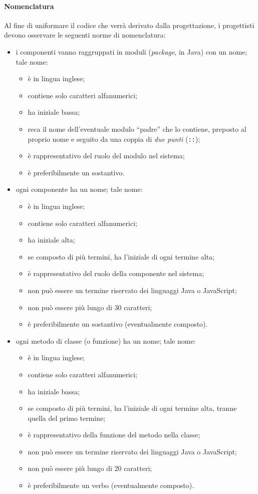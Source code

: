 	\paragraph{Nomenclatura} Al fine di uniformare il codice che verrà derivato dalla progettazione, i progettisti devono osservare le seguenti norme di nomenclatura:
	\begin{itemize}
		\item i componenti vanno raggruppati in moduli (\emph{package}, in Java) con un nome; tale nome:
		\begin{itemize}
			\item è in lingua inglese;
			\item contiene solo caratteri alfanumerici;
			\item ha iniziale bassa;
			\item reca il nome dell'eventuale modulo “padre” che lo contiene, preposto al proprio nome e seguito da una coppia di \emph{due punti} (\texttt{::});
			\item è rappresentativo del ruolo del modulo nel sistema;
			\item è preferibilmente un sostantivo.
		\end{itemize}
		\item ogni componente ha un nome; tale nome:
		\begin{itemize}
			\item è in lingua inglese;
			\item contiene solo caratteri alfanumerici;
			\item ha iniziale alta;
			\item se composto di più termini, ha l'iniziale di ogni termine alta;
			\item è rappresentativo del ruolo della componente nel sistema;
			\item non può essere un termine riservato dei linguaggi Java o JavaScript;
			\item non può essere più lungo di 30 caratteri;
			\item è preferibilmente un sostantivo (eventualmente composto).
		\end{itemize}
		\item ogni metodo di classe (o funzione) ha un nome; tale nome:
		\begin{itemize}
			\item è in lingua inglese;
			\item contiene solo caratteri alfanumerici;
			\item ha iniziale bassa;
			\item se composto di più termini, ha l'iniziale di ogni termine alta, tranne quella del primo termine;
			\item è rappresentativo della funzione del metodo nella classe;
			\item non può essere un termine riservato dei linguaggi Java o JavaScript;
			\item non può essere più lungo di 20 caratteri;
			\item è preferibilmente un verbo (eventualmente composto).
		\end{itemize}
	\end{itemize}

